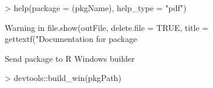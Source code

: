 \documentclass[a4paper,12pt]{article}\usepackage[]{graphicx}\usepackage[]{color}
\begin{document}
\begin{Schunk}
\begin{Sinput}
> help(package = (pkgName), help_type = "pdf")
\end{Sinput}
\begin{Soutput}
Warning in file.show(outFile, delete.file = TRUE, title = gettextf("Documentation for package %s", : '"C:\Program Files (x86)\EmEditor\EmEditor.exe"' not found
\end{Soutput}
\end{Schunk}

Send package to R Windows builder

\begin{Schunk}
\begin{Sinput}
> devtools::build_win(pkgPath)
\end{Sinput}
\end{Schunk}

%
%

%

\clearpage
\end{document}
